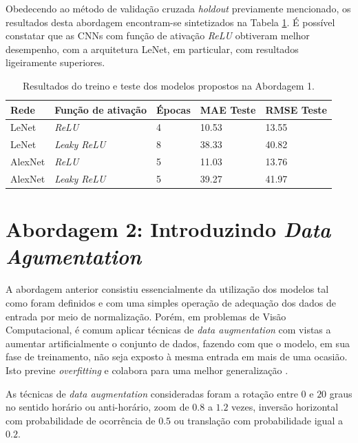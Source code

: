 	Obedecendo ao método de validação cruzada \emph{holdout} previamente mencionado, os resultados desta abordagem encontram-se sintetizados na Tabela \ref{tab:results-1}. É possível constatar que as CNNs com função de ativação \emph{ReLU} obtiveram melhor desempenho, com a arquitetura LeNet, em particular, com resultados ligeiramente superiores.

  \begin{table}[!ht]
		\caption{Resultados do treino e teste dos modelos propostos na Abordagem 1.}
		\label{tab:results-1}
		\begin{center}
			\begin{tabular}{l l l l l}
				\toprule
				Rede & Função de ativação & Épocas & MAE Teste & RMSE Teste \\
				\midrule
				LeNet & \emph{ReLU}  & 4 & 10.53 & 13.55 \\
				LeNet & \emph{Leaky ReLU} & 8 & 38.33 & 40.82 \\
				AlexNet & \emph{ReLU}  & 5 & 11.03 & 13.76 \\
				AlexNet & \emph{Leaky ReLU} & 5 & 39.27 & 41.97 \\
				\bottomrule
			\end{tabular}
		\end{center}
	\end{table}

\section{Abordagem 2: Introduzindo \emph{Data Agumentation}}%

	A abordagem anterior consistiu essencialmente da utilização dos modelos tal como foram definidos e com uma simples operação de adequação dos dados de entrada por meio de normalização. Porém, em problemas de Visão Computacional, é comum aplicar técnicas de \emph{data augmentation} com vistas a aumentar artificialmente o conjunto de dados, fazendo com que o modelo, em sua fase de treinamento, não seja exposto à mesma entrada em mais de uma ocasião. Isto previne \emph{overfitting} e colabora para uma melhor generalização \cite{chollet2017deep}.

	As técnicas de \emph{data augmentation} consideradas foram a rotação entre $0$ e $20$ graus no sentido horário ou anti-horário, zoom de $0.8$ a $1.2$ vezes, inversão horizontal com probabilidade de ocorrência de $0.5$ ou translação com probabilidade igual a $0.2$.

